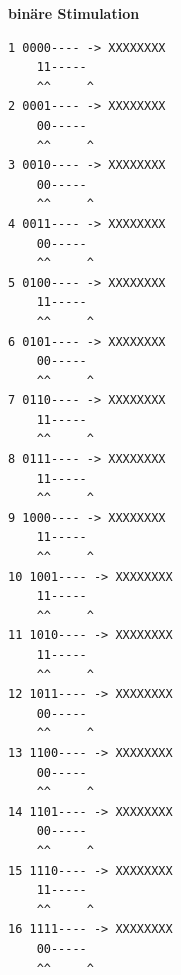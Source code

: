 \documentclass[fleqn]{article}
\begin{document}
\textbf{binäre Stimulation}
\begin{lstlisting}
1 0000---- -> XXXXXXXX                                         
    11----- 
    ^^     ^
2 0001---- -> XXXXXXXX                                         
    00----- 
    ^^     ^
3 0010---- -> XXXXXXXX                                         
    00----- 
    ^^     ^
4 0011---- -> XXXXXXXX                                         
    00----- 
    ^^     ^
5 0100---- -> XXXXXXXX                                         
    11----- 
    ^^     ^
6 0101---- -> XXXXXXXX                                         
    00----- 
    ^^     ^
7 0110---- -> XXXXXXXX                                         
    11----- 
    ^^     ^
8 0111---- -> XXXXXXXX                                         
    11----- 
    ^^     ^
9 1000---- -> XXXXXXXX                                         
    11----- 
    ^^     ^
10 1001---- -> XXXXXXXX                                         
    11----- 
    ^^     ^
11 1010---- -> XXXXXXXX                                         
    11----- 
    ^^     ^
12 1011---- -> XXXXXXXX                                         
    00----- 
    ^^     ^
13 1100---- -> XXXXXXXX                                         
    00----- 
    ^^     ^
14 1101---- -> XXXXXXXX                                         
    00----- 
    ^^     ^
15 1110---- -> XXXXXXXX                                         
    11----- 
    ^^     ^
16 1111---- -> XXXXXXXX                                         
    00----- 
    ^^     ^

\end{lstlisting}
\end{document}

